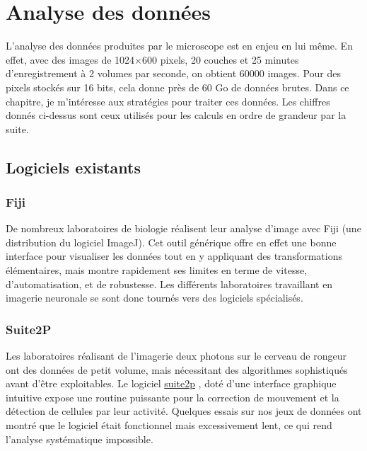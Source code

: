 \section{Analyse des données}

L'analyse des données produites par le microscope est en enjeu en lui même. En effet, avec des images de 1024$\times$600 pixels, 20 couches et 25 minutes d'enregistrement à 2 volumes par seconde, on obtient 60000 images. Pour des pixels stockés sur 16 bits, cela donne près de 60 Go de données brutes. Dans ce chapitre, je m'intéresse aux stratégies pour traiter ces données. Les chiffres donnés ci-dessus sont ceux utilisés pour les calculs en ordre de grandeur par la suite.

\subsection{Logiciels existants}

\subsubsection{Fiji}

De nombreux laboratoires de biologie réalisent leur analyse d'image avec Fiji (une distribution du logiciel ImageJ). Cet outil générique offre en effet une bonne interface pour visualiser les données tout en y appliquant des transformations élémentaires, mais montre rapidement ses limites en terme de vitesse, d'automatisation, et de robustesse. Les différents laboratoires travaillant en imagerie neuronale se sont donc tournés vers des logiciels spécialisés.

\subsubsection{Suite2P}

Les laboratoires réalisant de l'imagerie deux photons sur le cerveau de rongeur ont des données de petit volume, mais nécessitant des algorithmes sophistiqués avant d'être exploitables. Le logiciel \href{https://www.suite2p.org/}{suite2p} \cite{pachitariu_suite2p_2016}, doté d'une interface graphique intuitive expose une routine puissante pour la correction de mouvement et la détection de cellules par leur activité. Quelques essais sur nos jeux de données ont montré que le logiciel était fonctionnel mais excessivement lent, ce qui rend l'analyse systématique impossible.


